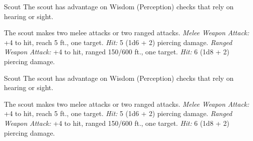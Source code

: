 \documentclass[10pt,a4paper,twoside,twocolumn,openany,bg=none,nodeprecatedcode]{dndbook}
\begin{document}
\begin{DndMonster}[float*=t]{Scout}
\DndMonsterBasics[
armor-class = {13 (leather armor)},
hit-points = {\DndDice{3d8 + 3}},
speed = {30 ft.}
]
\DndMonsterAbilityScores[
 str = 11,
 dex = 14,
 con = 12,
 int = 11,
 wis = 13,
 cha = 11
]
\DndMonsterDetails[
skills = {Nature +4, Perception +5, Stealth +6, Survival +5},
languages = {any one language (usually Common)},
challenge = 1/2,
]
The scout has advantage on Wisdom (Perception) checks that rely on hearing or sight.
\par
{}
The scout makes two melee attacks or two ranged attacks.
\textsl{Melee Weapon Attack:} +4 to hit, reach 5 ft., one target. \textsl{Hit:} 5 (1d6 + 2) piercing damage.
\textsl{Ranged Weapon Attack:} +4 to hit, ranged 150/600 ft., one target. \textsl{Hit:} 6 (1d8 + 2) piercing damage.
\end{DndMonster}



\begin{DndMonster}[float*=t]{Scout}
\DndMonsterBasics[
armor-class = {13 (leather armor)},
hit-points = {\DndDice{3d8 + 3}},
speed = {30 ft.}
]
\DndMonsterAbilityScores[
 str = 11,
 dex = 14,
 con = 12,
 int = 11,
 wis = 13,
 cha = 11
]
\DndMonsterDetails[
skills = {Nature +4, Perception +5, Stealth +6, Survival +5},
languages = {any one language (usually Common)},
challenge = 1/2,
]
The scout has advantage on Wisdom (Perception) checks that rely on hearing or sight.
\par
{}
The scout makes two melee attacks or two ranged attacks.
\textsl{Melee Weapon Attack:} +4 to hit, reach 5 ft., one target. \textsl{Hit:} 5 (1d6 + 2) piercing damage.
\textsl{Ranged Weapon Attack:} +4 to hit, ranged 150/600 ft., one target. \textsl{Hit:} 6 (1d8 + 2) piercing damage.
\end{DndMonster}
\end{document}
